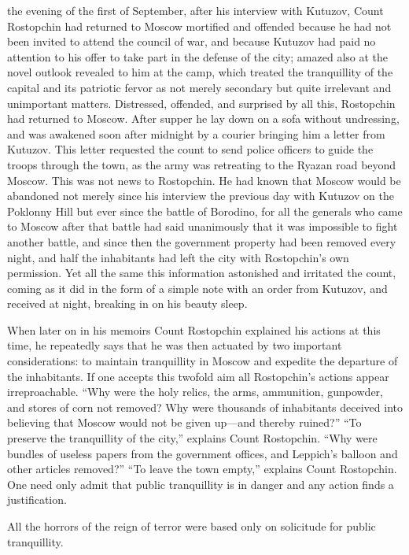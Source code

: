  the evening of the first of September, after his interview
with Kutuzov, Count Rostopchin had returned to Moscow mortified
and offended because he had not been invited to attend the
council of war, and because Kutuzov had paid no attention to his
offer to take part in the defense of the city; amazed also at the
novel outlook revealed to him at the camp, which treated the
tranquillity of the capital and its patriotic fervor as not
merely secondary but quite irrelevant and unimportant
matters. Distressed, offended, and surprised by all this,
Rostopchin had returned to Moscow. After supper he lay down on a
sofa without undressing, and was awakened soon after midnight by
a courier bringing him a letter from Kutuzov. This letter
requested the count to send police officers to guide the troops
through the town, as the army was retreating to the Ryazan road
beyond Moscow. This was not news to Rostopchin. He had known that
Moscow would be abandoned not merely since his interview the
previous day with Kutuzov on the Poklonny Hill but ever since the
battle of Borodino, for all the generals who came to Moscow after
that battle had said unanimously that it was impossible to fight
another battle, and since then the government property had been
removed every night, and half the inhabitants had left the city
with Rostopchin's own permission. Yet all the same this
information astonished and irritated the count, coming as it did
in the form of a simple note with an order from Kutuzov, and
received at night, breaking in on his beauty sleep.

When later on in his memoirs Count Rostopchin explained his
actions at this time, he repeatedly says that he was then
actuated by two important considerations: to maintain
tranquillity in Moscow and expedite the departure of the
inhabitants. If one accepts this twofold aim all Rostopchin's
actions appear irreproachable. ``Why were the holy relics, the
arms, ammunition, gunpowder, and stores of corn not removed? Why
were thousands of inhabitants deceived into believing that Moscow
would not be given up---and thereby ruined?'' ``To preserve the
tranquillity of the city,'' explains Count Rostopchin. ``Why were
bundles of useless papers from the government offices, and
Leppich's balloon and other articles removed?'' ``To leave the
town empty,'' explains Count Rostopchin.  One need only admit
that public tranquillity is in danger and any action finds a
justification.

All the horrors of the reign of terror were based only on
solicitude for public tranquillity.

